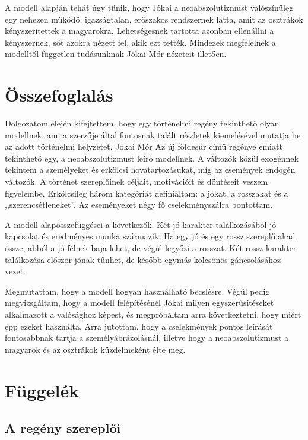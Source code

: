 \documentclass{thesis-ekf}
\begin{document}
    A modell alapján tehát úgy tűnik, hogy Jókai a neoabszolutizmust valószínűleg egy nehezen működő, igazságtalan,
        erőszakos rendszernek látta, amit az osztrákok kényszerítettek a magyarokra.
    Lehetségesnek tartotta azonban ellenállni a kényszernek, sőt azokra nézett fel, akik ezt tették.
    Mindezek megfelelnek a modelltől független tudásunknak Jókai Mór nézeteit illetően.

    \chapter{Összefoglalás}

    Dolgozatom elején kifejtettem, hogy egy történelmi regény tekinthető olyan modellnek, ami a szerzője által
        fontosnak talált részletek kiemelésével mutatja be az adott történelmi helyzetet.
    Jókai Mór Az új földesúr című regénye emiatt tekinthető egy, a neoabszolutizmust leíró modellnek.
    A változók közül exogénnek tekintem a személyeket és erkölcsi hovatartozásukat, míg az események endogén változók.
    A történet szereplőinek céljait, motivációit és döntéseit veszem figyelembe.
    Erkölcsileg három kategóriát definiáltam: a jókat, a rosszakat és a ,,szerencsétleneket''.
    Az eseményeket négy fő cselekményszálra bontottam.

    A modell alapösszefüggései a következők.
    Két jó karakter találkozásából jó kapcsolat és eredményes munka származik.
    Ha egy jó és egy rossz szereplő akad össze, abból a jó félnek baja lehet, de végül legyőzi a rosszat.
    Két rossz karakter találkozása először jónak tűnhet, de később egymás kölcsönös gáncsolásához vezet.

    Megmutattam, hogy a modell hogyan használható becslésre.
    Végül pedig megvizsgáltam, hogy a modell felépítésénél Jókai milyen egyszerűsítéseket alkalmazott a valósághoz képest,
        és megpróbáltam arra következtetni, hogy miért épp ezeket használta.
    Arra jutottam, hogy a cselekmények pontos leírását fontosabbnak tartja a személyábrázolásnál,
        illetve hogy a neoabszolutizmust a magyarok és az osztrákok küzdelmeként élte meg.

    \chapter{Függelék}

    \section{A regény szereplői}
\end{document}
